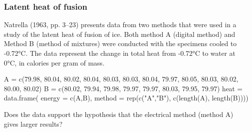 \documentclass[a4paper]{article}\usepackage[]{graphicx}\usepackage[]{xcolor}
\begin{document}
\subsubsection{Latent heat of fusion}
Natrella (1963, pp. 3--23) presents data from two methods that were used in a study of the latent heat of fusion of ice. Both method A (digital method) and Method B (method of mixtures) were conducted with the specimens cooled to -0.72°C. The data represent the change in total heat from -0.72°C to water at 0°C, in calories per gram of mass.
\begin{Schunk}
\begin{Sinput}
A = c(79.98, 80.04, 80.02, 80.04, 80.03, 80.03, 80.04, 79.97, 
	80.05, 80.03, 80.02, 80.00, 80.02)
B = c(80.02, 79.94, 79.98, 79.97, 79.97, 80.03, 79.95, 79.97)
heat = data.frame(
	energy = c(A,B),
	method = rep(c("A","B"), c(length(A), length(B))))
\end{Sinput}
\end{Schunk}
\begin{goldbox}
	Does the data support the hypothesis that the electrical method (method A) gives larger results?
\end{goldbox}
\end{document}
